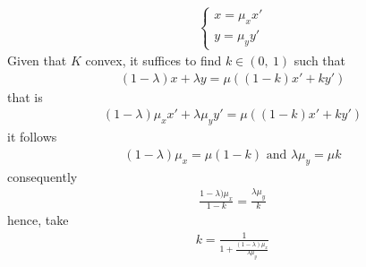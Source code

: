 \documentclass{ExerciseSheet}
\begin{document}
\begin{solution}
\begin{enumerate}
\begin{align*}
                 \begin{cases}
                     x=\mu_x x'\\
                     y=\mu_y y'
                 \end{cases}
             \end{align*}
             Given that $K$ convex, it suffices to find $k\in(0,~1)$ such that 
             \begin{align*}
                 (1-\lambda)x+\lambda y = \mu((1-k)x'+k y' )
             \end{align*}
            that is
            \begin{align*}
                 (1-\lambda)\mu_xx'+\lambda \mu_yy' = \mu((1-k)x'+k y' )
             \end{align*}
        it follows
            \begin{align*}
                 (1-\lambda)\mu_x = \mu(1-k) \text{ and } \lambda \mu_y = \mu k 
             \end{align*}
        consequently
             \begin{align*}
                 \frac{1-\lambda)\mu_x}{1-k} = \frac{\lambda\mu_y}{k}
             \end{align*}
        hence, take
        \begin{align*}
            k = \frac{1}{1+ \frac{(1-\lambda)\mu_x}{\lambda \mu_y}}
        \end{align*}
    \end{enumerate}
\end{solution}
\fi
\end{document}
